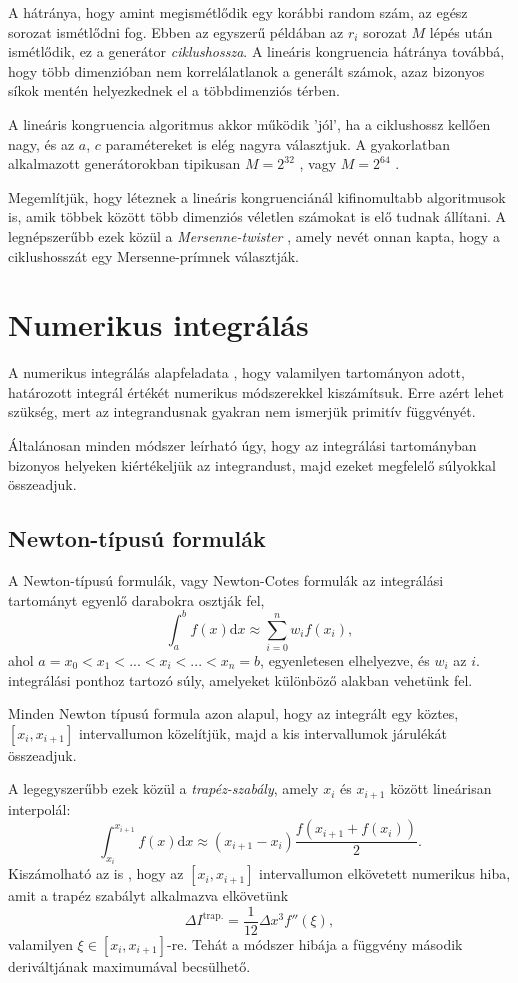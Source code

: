 \documentclass[12pt]{article}
\theoremstyle{plain}
\begin{document}
A hátránya, hogy amint megismétlődik egy korábbi random szám, az egész sorozat ismétlődni fog. Ebben az egyszerű példában az $r_i$ sorozat $M$ lépés után ismétlődik, ez a generátor {\em ciklushossza}. A lineáris kongruencia hátránya továbbá, hogy több dimenzióban nem korrelálatlanok a generált számok, azaz bizonyos síkok mentén helyezkednek el a többdimenziós térben.

A lineáris kongruencia algoritmus akkor működik 'jól', ha a ciklushossz kellően nagy, és az $a$, $c$ paramétereket is elég nagyra választjuk. A gyakorlatban alkalmazott generátorokban tipikusan $M=2^{32}$ \cite{numrecipes}, vagy $M=2^{64}$ \cite{knuth}. 

Megemlítjük, hogy léteznek a lineáris kongruenciánál kifinomultabb algoritmusok is, amik többek között több dimenziós véletlen számokat is elő tudnak állítani. A legnépszerűbb ezek közül a {\em Mersenne-twister} \cite{random}, amely nevét onnan kapta, hogy a ciklushosszát egy Mersenne-prímnek választják.  
\section{Numerikus integrálás}
A numerikus integrálás alapfeladata \cite{landau}, hogy valamilyen tartományon adott, határozott integrál értékét numerikus módszerekkel kiszámítsuk. Erre azért lehet szükség, mert az integrandusnak gyakran nem ismerjük primitív függvényét. 

Általánosan minden módszer leírható úgy, hogy az integrálási tartományban bizonyos helyeken kiértékeljük az integrandust, majd ezeket megfelelő súlyokkal összeadjuk. 
\subsection{Newton-típusú formulák}
A Newton-típusú formulák, vagy Newton-Cotes formulák az integrálási tartományt egyenlő darabokra osztják fel,
\begin{equation}
    \label{nc}
    \int_a^b f(x) \text{d}x  \approx \sum_{i=0}^n w_i f(x_i),
\end{equation}
ahol $a = x_0 < x_1 < ... < x_i < ... < x_n=b$, egyenletesen elhelyezve, és $w_i$ az $i$. integrálási ponthoz tartozó súly, amelyeket különböző alakban vehetünk fel. 

Minden Newton típusú formula azon alapul, hogy az integrált egy köztes, $[x_i, x_{i+1}]$ intervallumon közelítjük, majd a kis intervallumok járulékát összeadjuk. 

A legegyszerűbb ezek közül a {\em trapéz-szabály}, amely $x_i$ és $x_{i+1}$ között lineárisan interpolál:
\begin{equation}
    \label{trap}
    \int_{x_{i}}^{x_{i+1}} f(x) \text{d}x \approx (x_{i+1} - x_i) \frac{f(x_{i+1} + f(x_i))}{2}.
\end{equation}
Kiszámolható az is \cite{error}, hogy az $[x_i, x_{i+1}]$ intervallumon elkövetett numerikus hiba, amit a trapéz szabályt alkalmazva elkövetünk
$$
\Delta I ^{\text{trap.}} = \frac{1}{12}\Delta x^3 f''(\xi),
$$
valamilyen $\xi \in [x_i, x_{i+1}]$-re. Tehát a módszer hibája a függvény második deriváltjának maximumával becsülhető.
\end{document}
